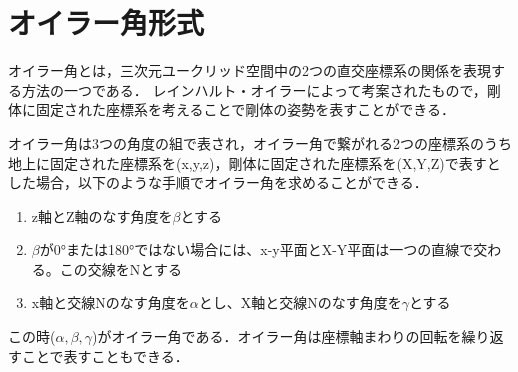 \documentclass[a4j, fleqn, 12pt]{jsreport}
\begin{document}
\chapter{オイラー角形式}\label{Euler}
オイラー角\cite{オイラー}とは，三次元ユークリッド空間中の2つの直交座標系の関係を表現する方法の一つである．
レインハルト・オイラーによって考案されたもので，剛体に固定された座標系を考えることで剛体の姿勢を表すことができる．

オイラー角は3つの角度の組で表され，オイラー角で繋がれる2つの座標系のうち地上に固定された座標系を(x,y,z)，剛体に固定された座標系を(X,Y,Z)で表すとした場合，以下のような手順でオイラー角を求めることができる．
\begin{enumerate}
  \item z軸とZ軸のなす角度を$\beta$とする
  \item $\beta$が0°または180°ではない場合には、x-y平面とX-Y平面は一つの直線で交わる。この交線をNとする
  \item x軸と交線Nのなす角度を$\alpha$とし、X軸と交線Nのなす角度を$\gamma$とする
\end{enumerate}
この時($\alpha,\beta,\gamma$)がオイラー角である．オイラー角は座標軸まわりの回転を繰り返すことで表すこともできる．
\end{document}
